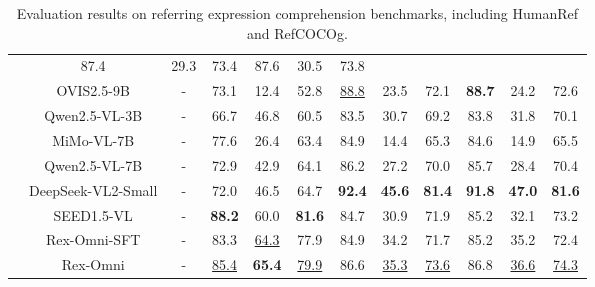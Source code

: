 \begin{table}[t]
{\begin{tabular}{cc|c|ccc|ccc|ccc}
& 87.4 & 29.3 & 73.4 
& 87.6 & 30.5 & 73.8 \\
& OVIS2.5-9B & - 
& 73.1 & 12.4 & 52.8 
& \underline{88.8} & 23.5 & 72.1 
& \textbf{88.7} & 24.2 & 72.6 \\
& Qwen2.5-VL-3B & - 
& 66.7 & 46.8 & 60.5 
& 83.5 & 30.7 & 69.2 
& 83.8 & 31.8 & 70.1 \\
& MiMo-VL-7B & - 
& 77.6 & 26.4 & 63.4 
& 84.9 & 14.4 & 65.3 
& 84.6 & 14.9 & 65.5 \\
& Qwen2.5-VL-7B & - 
& 72.9 & 42.9 & 64.1 
& 86.2 & 27.2 & 70.0 
& 85.7 & 28.4 & 70.4 \\
& DeepSeek-VL2-Small & - 
& 72.0 & 46.5 & 64.7 
& \textbf{92.4} & \textbf{45.6} & \textbf{81.4} 
& \textbf{91.8} & \textbf{47.0} & \textbf{81.6} \\
& SEED1.5-VL & - 
& \textbf{88.2} & 60.0 & \textbf{81.6} 
& 84.7 & 30.9 & 71.9 
& 85.2 & 32.1 & 73.2 \\
\rowcolor{lightblue!10}
& Rex-Omni-SFT & - 
& 83.3 & \underline{64.3} & 77.9 
& 84.9 & 34.2 & 71.7 
& 85.2 & 35.2 & 72.4 \\
\rowcolor{lightblue!10}
& Rex-Omni & - 
& \underline{85.4} & \textbf{65.4} & \underline{79.9} 
& 86.6 & \underline{35.3} & \underline{73.6} 
& 86.8 & \underline{36.6} & \underline{74.3} \\
\bottomrule
\end{tabular}
    }
    \caption{Evaluation results on referring expression comprehension benchmarks, including HumanRef and RefCOCOg.}
    \label{tab:referring_detection}
\end{table}
